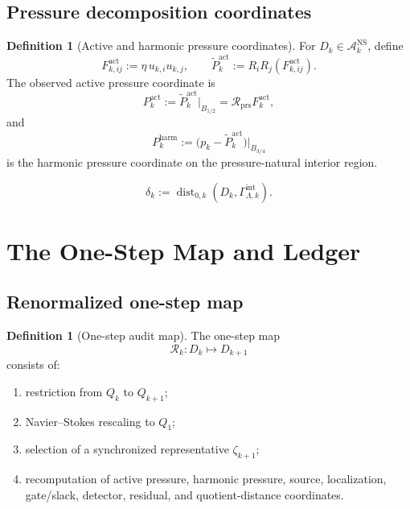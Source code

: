 \documentclass[11pt]{article}
\numberwithin{equation}{section}
\theoremstyle{plain}
\theoremstyle{definition}
\newtheorem{definition}[theorem]{Definition}
\theoremstyle{remark}
\newcommand{\NS}{\mathrm{NS}}
\newcommand{\intg}{\mathrm{int}}
\newcommand{\prs}{\mathrm{prs}}
\newcommand{\harm}{\mathrm{harm}}
\newcommand{\dist}{\operatorname{dist}}
\newcommand{\A}{\mathcal A}
\newcommand{\Rprs}{\mathcal R_{\prs}}
\begin{document}
\subsection{Pressure decomposition coordinates}

\begin{definition}[Active and harmonic pressure coordinates]
\label{def:pressure-coordinates}
For \(D_k\in\A_k^{\NS}\), define
\[
  F_{k,ij}^{\mathrm{act}}:=\eta\,u_{k,i}u_{k,j},
  \qquad
  \widetilde P_k^{\mathrm{act}}:=R_iR_j(F_{k,ij}^{\mathrm{act}}).
\]
The observed active pressure coordinate is
\[
  P_k^{\mathrm{act}}
  :=
  \widetilde P_k^{\mathrm{act}}\big|_{B_{1/2}}
  =
  \Rprs F_k^{\mathrm{act}},
\]
and
\[
  P_k^{\harm}
  :=
  \bigl(p_k-\widetilde P_k^{\mathrm{act}}\bigr)\big|_{B_{3/4}}
\]
is the harmonic pressure coordinate on the pressure-natural interior region.
\end{definition}



\begin{equation}\label{eq:delta-k}
  \delta_k:=\dist_{0,k}(D_k,\Gamma_{\Lambda,k}^{\intg}).
\end{equation}

\section{The One-Step Map and Ledger}
\label{sec:one-step}

\subsection{Renormalized one-step map}

\begin{definition}[One-step audit map]\label{def:one-step-map}
The one-step map
\[
  \mathcal R_k:D_k\mapsto D_{k+1}
\]
consists of:
\begin{enumerate}[label=(\roman*)]
  \item restriction from \(Q_k\) to \(Q_{k+1}\);
  \item Navier--Stokes rescaling to \(Q_1\);
  \item selection of a synchronized representative \(\zeta_{k+1}\);
  \item recomputation of active pressure, harmonic pressure, source,
  localization, gate/slack, detector, residual, and quotient-distance
  coordinates.
\end{enumerate}
\end{definition}
\end{document}
